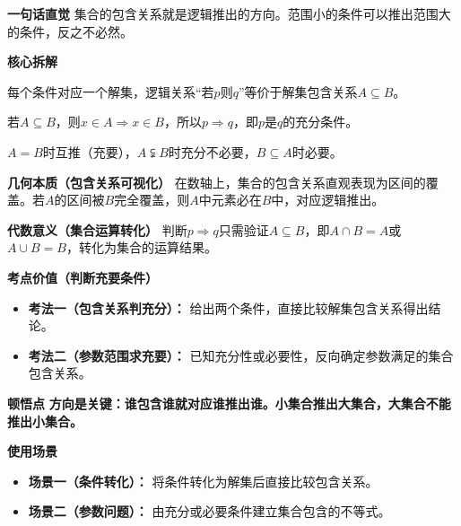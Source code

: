 \begin{explanationbox}
	\textbf{\textcolor{CExplanation}{一句话直觉}}
	集合的包含关系就是逻辑推出的方向。范围小的条件可以推出范围大的条件，反之不必然。

	\medskip
	\textbf{\textcolor{CExplanation}{核心拆解}}
	\begin{description}[style=nextline, leftmargin=2.8em, labelsep=0.5em, itemsep=0.45em]
		\item[\textbf{要点一（集合与逻辑对应）：}]
			每个条件对应一个解集，逻辑关系“若$p$则$q$”等价于解集包含关系$A\subseteq B$。
		\item[\textbf{要点二（包含方向定充分）：}]
			若$A\subseteq B$，则$x\in A\Rightarrow x\in B$，所以$p\Rightarrow q$，即$p$是$q$的充分条件。
		\item[\textbf{要点三（特殊情况分类）：}]
			$A=B$时互推（充要），$A\subsetneqq B$时充分不必要，$B\subseteq A$时必要。
	\end{description}

	\medskip
	\textbf{\textcolor{CExplanation}{几何本质（包含关系可视化）}}
	在数轴上，集合的包含关系直观表现为区间的覆盖。若$A$的区间被$B$完全覆盖，则$A$中元素必在$B$中，对应逻辑推出。

	\medskip
	\textbf{\textcolor{CExplanation}{代数意义（集合运算转化）}}
	判断$p\Rightarrow q$只需验证$A\subseteq B$，即$A\cap B = A$或$A\cup B = B$，转化为集合的运算结果。

	\medskip
	\textbf{\textcolor{CExplanation}{考点价值（判断充要条件）}}
	\begin{itemize}[leftmargin=*, itemsep=0.5em, topsep=0.4em]
		\item \textbf{考法一（包含关系判充分）：} 给出两个条件，直接比较解集包含关系得出结论。
		\item \textbf{考法二（参数范围求充要）：} 已知充分性或必要性，反向确定参数满足的集合包含关系。
	\end{itemize}

	\medskip
	\textbf{\textcolor{CExplanation}{顿悟点}}
	\textbf{方向是关键：谁包含谁就对应谁推出谁。小集合推出大集合，大集合不能推出小集合。}

	\medskip
	\textbf{\textcolor{CExplanation}{使用场景}}
	\begin{itemize}[leftmargin=*, itemsep=0.5em, topsep=0.4em]
		\item \textbf{场景一（条件转化）：} 将条件转化为解集后直接比较包含关系。
		\item \textbf{场景二（参数问题）：} 由充分或必要条件建立集合包含的不等式。
	\end{itemize}

\end{explanationbox}
